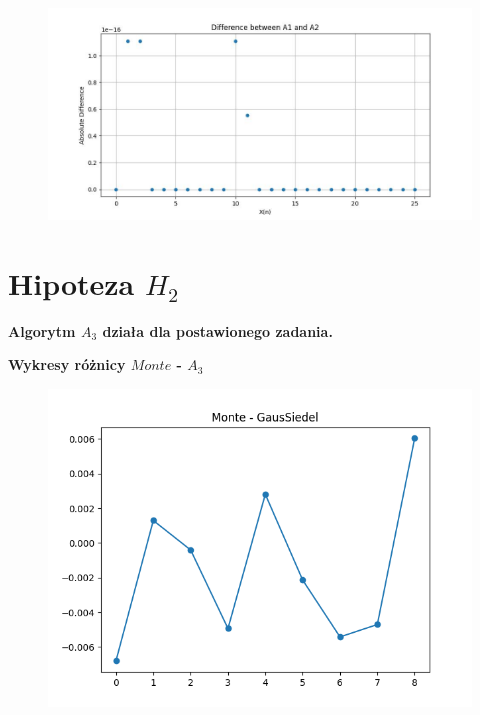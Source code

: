 \documentclass{article}
\begin{document}
\begin{figure}[ht!]
    \centering
    \includegraphics[width=1\linewidth]{h1_plot_9.jpg}
    \label{fig:my_label}
\end{figure}




\clearpage

\section{Hipoteza $H_2$}

\textbf{Algorytm $A_3$ działa dla postawionego zadania.}

\hspace{}

\textbf{Wykresy różnicy $Monte$ - $A_3$}

\begin{figure}[ht!]
    \centering
    \includegraphics[width=1\linewidth]{a3.png}
    \label{fig:my_label}
\end{figure}
\end{document}
